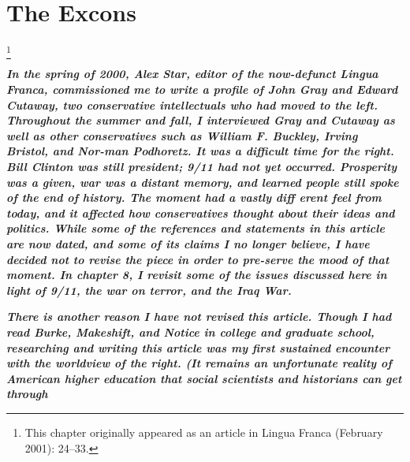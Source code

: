  
 \chapter{The Excons}  

 \label{The Excons}  
 
 
\par
 
 
 \textit{	}  

 
\par
 
 
 
\par
 

 \textbf{\textit{	} }  

 
\par
 

 \footnote{This chapter originally appeared as an article in Lingua Franca (February 2001): 24–33.}  

 \textbf{\textit{In the spring of 2000, Alex Star, editor of the now-defunct Lingua Franca, commissioned me to write a profile of John Gray and Edward Cutaway, two conservative intellectuals who had moved to the left. Throughout the summer and fall, I interviewed Gray and Cutaway as well as other conservatives such as William F. Buckley, Irving Bristol, and Nor-man Podhoretz. It was a difficult time for the right. Bill Clinton was still president; 9/11 had not yet occurred. Prosperity was a given, war was a distant memory, and learned people still spoke of the end of history. The moment had a vastly diff erent feel from today, and it affected how conservatives thought about their ideas and politics. While some of the references and statements in this article are now dated, and some of its claims I no longer believe, I have decided not to revise the piece in order to pre-serve the mood of that moment. In chapter 8, I revisit some of the issues discussed here in light of 9/11, the war on terror, and the Iraq War.} } 

 
\par
 

 \textbf{\textit{There is another reason I have not revised this article. Though I had read Burke, Makeshift, and Notice in college and graduate school, researching and writing this article was my first sustained encounter with the worldview of the right. (It remains an unfortunate reality of American higher education that social scientists and historians can get through} } 

 
\par
 

